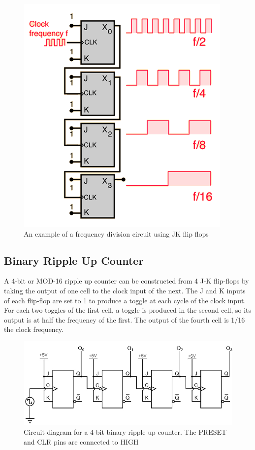 \begin{figure}[H]
    \centering
    \includegraphics[width=0.6\columnwidth]{images/freqdiv2.png}
    \caption{An example of a frequency division circuit using JK flip flops}
    \label{fig:0}
\end{figure}

\subsection{Binary Ripple Up Counter}
A 4-bit or MOD-16 ripple up counter can be constructed from 4 J-K flip-flops by taking the output of one cell to the clock input of the next. The J and K inputs of each flip-flop are set to 1 to produce a toggle at each cycle of the clock input. For each two toggles of the first cell, a toggle is produced in the second cell, so its output is at half the frequency of the first. The output of the fourth cell is 1/16 the clock frequency.

\begin{figure}[H]
    \centering
    \includegraphics[width=1\columnwidth]{images/up2.png}
    \caption{Circuit diagram for a 4-bit binary ripple up counter. The PRESET and CLR pins are connected to HIGH}
    \label{up}
\end{figure}


